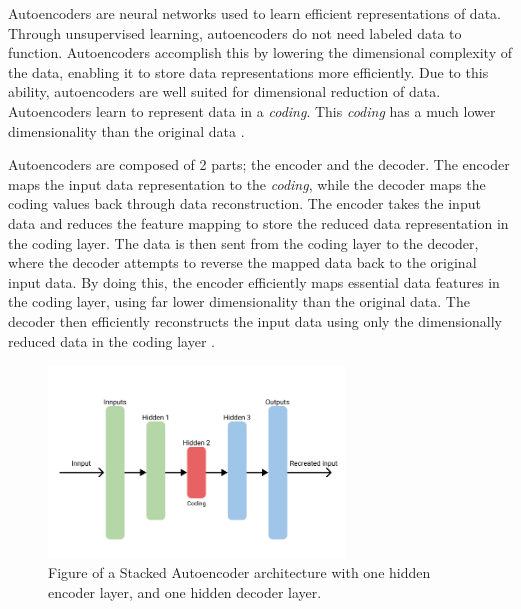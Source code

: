 \iffalse
    Autoencoders are neural networks used to learn efficient representations of data.
    Through unsupervised learning, autoencoders do not need labeled data to function.
    Autoencoders accomplish this by lowering the dimensional complexity of the data, enabling it to store data representations more efficiently.
    Due to this ability, autoencoders are well suited for dimensional reduction of data.
    Autoencoders learn to represent data in a \textit{coding}.
    This \textit{coding} has a much lower dimensionality than the original data
    \cite[p.~506-508]{Geron2017}.

    Autoencoders are composed of 2 parts; the encoder and the decoder.
    The encoder maps the input data representation to the \textit{coding}, while the decoder maps the coding values back through data reconstruction.
    The encoder takes the input data and reduces the feature mapping to store the reduced data representation in the coding layer.
    The data is then sent from the coding layer to the decoder, where the decoder attempts to reverse the mapped data back to the original input data.
    By doing this, the encoder efficiently maps essential data features in the coding layer, using far lower dimensionality than the original data.
    The decoder then efficiently reconstructs the input data using only the dimensionally reduced data in the coding layer
    \cite[p.~506-508]{Geron2017}.


    \begin{figure}[h!]
        \centering
        \includegraphics[width=0.7\textwidth]{./sections/BT/figures/Autoencoder.png}
        \hfill
        \caption{Figure of a Stacked Autoencoder architecture with one hidden encoder layer, and one hidden decoder layer.}
        \label{fig:stacked_autoencoder_arch}
    \end{figure}

